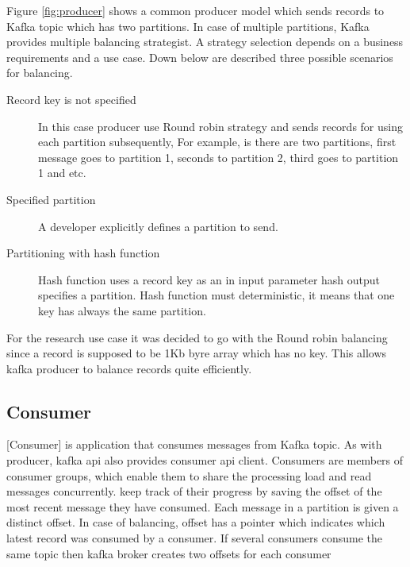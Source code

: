 Figure \ref{fig:producer} shows a common producer model which sends
records to Kafka topic which has two partitions.
In case of multiple partitions, Kafka provides multiple
balancing strategist.
A strategy selection depends on a business requirements and a use case.
Down below are described three possible scenarios for balancing.

\begin{description}
    \item[Record key is not specified] In this case producer use Round robin strategy
    and sends records for using each partition subsequently,
    For example, is there are two partitions, first message goes to partition 1,
    seconds to partition 2, third goes to partition 1 and etc.
    \item[Specified partition] A developer explicitly defines a partition to send.
    \item[Partitioning with hash function] Hash function uses a record key as
    an in input parameter hash output specifies a partition.
    Hash function must deterministic, it means that one key has always the same partition.
\end{description}

For the research use case it was decided to go with the Round robin balancing
since a record is supposed to be 1Kb byre array which has no key.
This allows kafka producer to balance records quite efficiently.

\newpage
\subsection{Consumer}\label{subsec:consumer}
[Consumer] is application that consumes messages from Kafka topic.
As with producer, kafka api also provides consumer api client.
Consumers are members of consumer groups, which enable them to share
the processing load and read messages concurrently.
keep track of their progress by saving the offset of the most recent
message they have consumed.
Each message in a partition is given a distinct offset.
In case of balancing, offset has a pointer which indicates which latest record was consumed by
a consumer.
If several consumers consume the same topic then kafka broker creates two offsets for
each consumer


